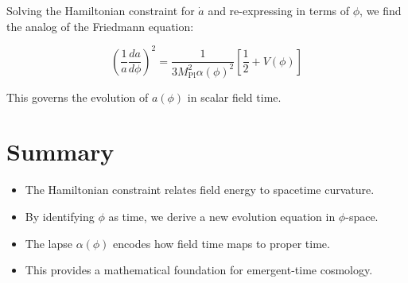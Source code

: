 \documentclass[12pt]{article}
\begin{document}
Solving the Hamiltonian constraint for $\dot{a}$ and re-expressing in terms of $\phi$, we find the analog of the Friedmann equation:

\begin{equation}
\left( \frac{1}{a} \frac{da}{d\phi} \right)^2 = \frac{1}{3 M_{\text{Pl}}^2 \alpha(\phi)^2} \left[ \frac{1}{2} + V(\phi) \right]
\end{equation}

This governs the evolution of $a(\phi)$ in scalar field time.

\section{Summary}

\begin{itemize}
  \item The Hamiltonian constraint relates field energy to spacetime curvature.
  \item By identifying $\phi$ as time, we derive a new evolution equation in $\phi$-space.
  \item The lapse $\alpha(\phi)$ encodes how field time maps to proper time.
  \item This provides a mathematical foundation for emergent-time cosmology.
\end{itemize}
\end{document}

